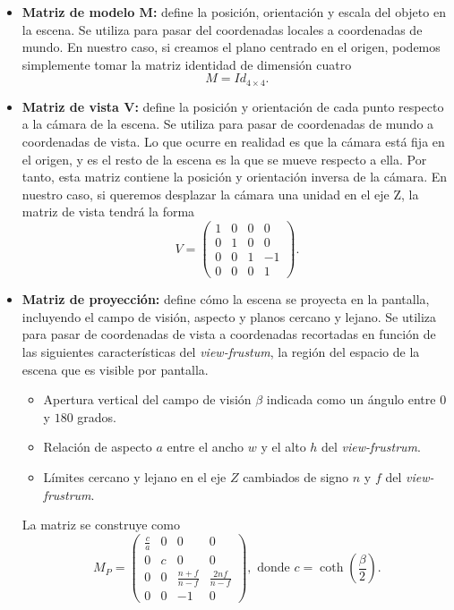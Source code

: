 \begin{itemize}
    \item \textbf{Matriz de modelo $\boldsymbol{M}$:} define la posición, orientación y escala del objeto en la escena. Se utiliza para pasar del coordenadas locales a coordenadas de mundo. En nuestro caso, si creamos el plano centrado en el origen, podemos simplemente tomar la matriz identidad de dimensión cuatro
    \begin{equation*}
        M = Id_{4\times 4}.
    \end{equation*}
    \item \textbf{Matriz de vista  $\boldsymbol{V}$:} define la posición y orientación de cada punto respecto a la cámara de la escena. Se utiliza para pasar de coordenadas de mundo a coordenadas de vista. Lo que ocurre en realidad es que la cámara está fija en el origen, y es el resto de la escena es la que se mueve respecto a ella. Por tanto, esta matriz contiene la posición y orientación inversa de la cámara. En nuestro caso, si queremos desplazar la cámara una unidad en el eje Z, la matriz de vista tendrá la forma
    \begin{equation*}
        V = \begin{pmatrix}
        1 & 0 & 0 & 0\\
        0 & 1 & 0 & 0\\
        0 & 0 & 1 & -1\\
        0 & 0 & 0 & 1
        \end{pmatrix}.
    \end{equation*}
    
    \item \textbf{Matriz de proyección:} define cómo la escena se proyecta en la pantalla, incluyendo el campo de visión, aspecto y planos cercano y lejano. Se utiliza para pasar de coordenadas de vista a coordenadas recortadas en función de las siguientes características del \textit{view-frustum}, la región del espacio de la escena que es visible por pantalla.
    \begin{itemize}
        \item Apertura vertical del campo de visión $\beta$ indicada como un ángulo entre $0$ y $180$ grados.
        \item Relación de aspecto $a$ entre el ancho $w$ y el alto $h$ del \textit{view-frustrum}.
        \item Límites cercano y lejano en el eje $Z$ cambiados de signo $n$ y $f$ del \textit{view-frustrum}.
    \end{itemize}
    La matriz se construye como
    \begin{equation*}
        M_P = \begin{pmatrix}
        \frac{c}{a} & 0 & 0 & 0\\
        0 & c & 0 & 0\\
        0 & 0 & \frac{n+f}{n-f} & \frac{2nf}{n-f}\\
        0 & 0 & -1 & 0
        \end{pmatrix}, \text{ donde } c = \coth\left({\frac{\beta}{2}}\right).
    \end{equation*}


\end{itemize}
